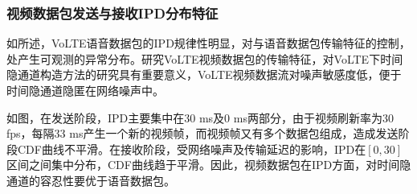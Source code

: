 \subsubsection{视频数据包发送与接收IPD分布特征}
\label{chap:backinfo:volte:packets:ipd}
如所述，VoLTE语音数据包的IPD规律性明显，对与语音数据包传输特征的控制，处产生可观测的异常分布。研究VoLTE视频数据包的传输特征，对VoLTE下时间隐通道构造方法的研究具有重要意义，VoLTE视频数据流对噪声敏感度低，便于时间隐通道隐匿在网络噪声中。


如图，在发送阶段，IPD主要集中在30 ms及0 ms两部分，由于视频刷新率为30 fps，每隔33 ms产生一个新的视频帧，而视频帧又有多个数据包组成，造成发送阶段CDF曲线不平滑。在接收阶段，受网络噪声及传输延迟的影响，IPD在$[0, 30]$区间之间集中分布，CDF曲线趋于平滑。因此，视频数据包在IPD方面，对时间隐通道的容忍性要优于语音数据包。

